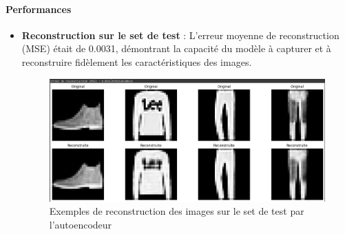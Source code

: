 \documentclass[unnumsec,webpdf,modern,large]{projet_manifold}%
\theoremstyle{thmstyleone}%
\theoremstyle{thmstyletwo}%
\theoremstyle{thmstylethree}%
\begin{document}
\paragraph{Performances}
\begin{itemize}
    \item \textbf{Reconstruction sur le set de test} : L'erreur moyenne de reconstruction (MSE) était de 0.0031, démontrant la capacité du modèle à capturer et à reconstruire fidèlement les caractéristiques des images.
    
    \begin{figure}[H]
        \centering
        \includegraphics[width=\columnwidth]{Fig/reconstruction_test_autoencoders.png}
        \caption{Exemples de reconstruction des images sur le set de test par l'autoencodeur}
        \label{fig:reconstruction_test}
    \end{figure}


\end{itemize}
\end{document}
